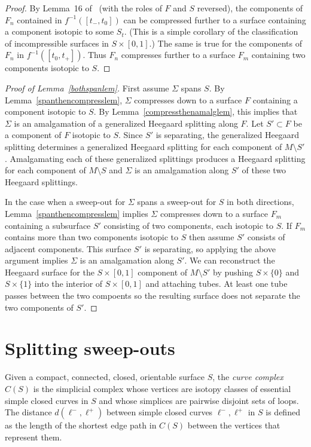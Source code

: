 \documentclass[12pt]{amsart}
\theoremstyle{plain}
\theoremstyle{definition}
\begin{document}
\begin{proof}
By Lemma~16 of~\cite{me:stabs} (with the roles of $F$ and $S$ reversed), the components of $F_n$ contained in $f^{-1}([t_-,t_0])$ can be compressed further to a surface containing a component isotopic to some $S_t$.  (This is a simple corollary of the classification of incompressible surfaces in $S \times [0,1]$.)  The same is true for the components of $F_n$ in $f^{-1}([t_0,t_+])$.  Thus $F_n$ compresses further to a surface $F_m$ containing two components isotopic to $S$.
\end{proof}


\begin{proof}[Proof of Lemma~\ref{bothspanlem}]
First assume $\Sigma$ spans $S$.  By Lemma~\ref{spanthencompresslem}, $\Sigma$ compresses down to a surface $F$ containing a component isotopic to $S$.  By Lemma~\ref{compressthenamalglem}, this implies that $\Sigma$ is an amalgamation of a generalized Heegaard splitting along $F$.  Let $S' \subset F$ be a component of $F$ isotopic to $S$.  Since $S'$ is separating, the generalized Heegaard splitting determines a generalized Heegaard splitting for each component of $M \setminus S'$.  Amalgamating each of these generalized splittings produces a Heegaard splitting for each component of $M \setminus S$ and $\Sigma$ is an amalgamation along $S'$ of these two Heegaard splittings.

In the case when a sweep-out for $\Sigma$ spans a sweep-out for $S$ in both directions, Lemma~\ref{spanthencompresslem} implies $\Sigma$ compresses down to a surface $F_m$ containing a subsurface $S'$ consisting of two components, each isotopic to $S$.  If $F_m$ contains more than two components isotopic to $S$ then assume $S'$ consists of adjacent components.  This surface $S'$ is separating, so applying the above argument implies $\Sigma$ is an amalgamation along $S'$.  We can reconstruct the Heegaard surface for the $S \times [0,1]$ component of $M \setminus S'$ by pushing $S \times \{0\}$ and $S \times \{1\}$ into the interior of $S \times [0,1]$ and attaching tubes.  At least one tube passes between the two compoents so the resulting surface does not separate the two components of $S'$.
\end{proof}





\section{Splitting sweep-outs}

Given a compact, connected, closed, orientable surface $S$, the \textit{curve complex} $C(S)$ is the simplicial complex whose vertices are isotopy classes of essential simple closed curves in $S$ and whose simplices are pairwise disjoint sets of loops.  The distance $d(\ell^-,\ell^+)$ between simple closed curves $\ell^-,\ell^+$ in $S$ is defined as the length of the shortest edge path in $C(S)$ between the vertices that represent them.  
\end{document}

